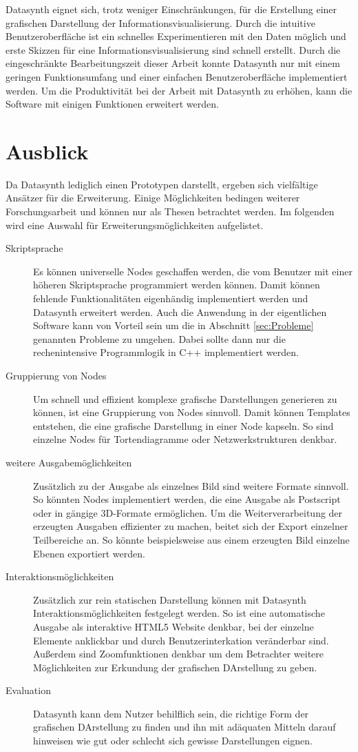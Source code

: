 \documentclass[a4paper, 12pt, DIVcalc, onepage, pdftex, headsepline, footsepline]{scrreprt}
\begin{document}
Datasynth eignet sich, trotz weniger Einschränkungen, für die Erstellung einer grafischen Darstellung der
Informationsvisualisierung. Durch die intuitive Benutzeroberfläche ist
ein schnelles Experimentieren mit den Daten möglich und
erste Skizzen für eine Informationsvisualisierung sind schnell erstellt.
Durch die eingeschränkte Bearbeitungszeit dieser Arbeit konnte Datasynth nur mit
einem geringen Funktionsumfang und einer einfachen Benutzeroberfläche implementiert werden.
Um die Produktivität bei der Arbeit mit Datasynth zu erhöhen, kann die Software
mit einigen Funktionen erweitert werden.

\section{Ausblick}
\label{sec:Ausblick}
Da Datasynth lediglich einen Prototypen darstellt, ergeben sich vielfältige
Ansätzer für die Erweiterung. Einige Möglichkeiten bedingen weiterer 
Forschungsarbeit und können nur als Thesen betrachtet werden. Im folgenden
wird eine Auswahl für Erweiterungsmöglichkeiten aufgelistet.
\begin{description}
\item[Skriptsprache]
Es können universelle Nodes geschaffen werden, die vom Benutzer mit einer höheren
Skriptsprache programmiert werden können. Damit können fehlende Funktionalitäten
eigenhändig implementiert werden und Datasynth erweitert werden.
Auch die Anwendung in der eigentlichen Software kann von Vorteil sein um die in
Abschnitt \ref{sec:Probleme} genannten Probleme zu umgehen. Dabei sollte dann nur
die rechenintensive Programmlogik in C++ implementiert werden.
\item[Gruppierung von Nodes]
Um schnell und effizient komplexe grafische Darstellungen generieren zu können,
ist eine Gruppierung von Nodes sinnvoll. Damit können Templates entstehen,
die eine grafische Darstellung in einer Node kapseln. So sind einzelne Nodes
für Tortendiagramme oder Netzwerkstrukturen denkbar.
\item[weitere Ausgabemöglichkeiten]
Zusätzlich zu der Ausgabe als einzelnes Bild sind weitere Formate sinnvoll.
So könnten Nodes implementiert werden, die eine Ausgabe als Postscript oder
in gängige 3D-Formate ermöglichen. Um die Weiterverarbeitung der erzeugten
Ausgaben effizienter zu machen, beitet sich der Export einzelner Teilbereiche
an. So könnte beispielsweise aus einem erzeugten Bild einzelne Ebenen exportiert werden.
\item[Interaktionsmöglichkeiten]
Zusätzlich zur rein statischen Darstellung können mit Datasynth
Interaktionsmöglichkeiten festgelegt werden. So ist eine automatische
Ausgabe als interaktive HTML5 Website denkbar, bei der einzelne Elemente
anklickbar und durch Benutzerinterkation veränderbar sind. Außerdem sind 
Zoomfunktionen denkbar um dem Betrachter weitere Möglichkeiten zur
Erkundung der grafischen DArstellung zu geben.
\item[Evaluation]
Datasynth kann dem Nutzer behilflich sein, die richtige Form
der grafischen DArstellung zu finden und ihn mit adäquaten Mitteln darauf
hinweisen wie gut oder schlecht sich gewisse Darstellungen eignen.
\end{description}
    
\end{document}
